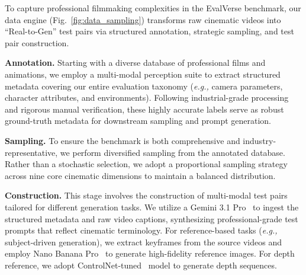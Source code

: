 \documentclass{article}
\begin{document}
To capture professional filmmaking complexities in the EvalVerse benchmark, our data engine (Fig.~\ref{fig:data_sampling}) transforms raw cinematic videos into ``Real-to-Gen'' test pairs via structured annotation, strategic sampling, and test pair construction.


\noindent \textbf{Annotation.} Starting with a diverse database of professional films and animations, we employ a multi-modal perception suite to extract structured metadata covering our entire evaluation taxonomy (\textit{e.g.,} camera parameters, character attributes, and environments). Following industrial-grade processing and rigorous manual verification, these highly accurate labels serve as robust ground-truth metadata for downstream sampling and prompt generation.

\noindent \textbf{Sampling.} To ensure the benchmark is both comprehensive and industry-representative, we perform diversified sampling from the annotated database. Rather than a stochastic selection, we adopt a proportional sampling strategy across nine core cinematic dimensions to maintain a balanced distribution.

\noindent
 \textbf{Construction.} This stage involves the construction of multi-modal test pairs tailored for different generation tasks. We utilize a Gemini 3.1 Pro~\cite{gemini} to ingest the structured metadata and raw video captions, synthesizing professional-grade test prompts that reflect cinematic terminology. For reference-based tasks (\textit{e.g.,} subject-driven generation), we extract keyframes from the source videos and employ Nano Banana Pro~\cite{nanobanana} to generate high-fidelity reference images. For depth reference, we adopt ControlNet-tuned~\cite{controlnet} model to generate depth sequences.
\end{document}
